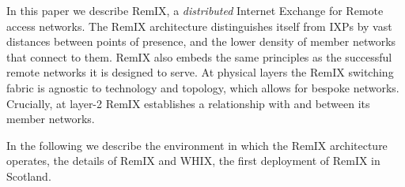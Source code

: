 In this paper we describe RemIX, a \emph{distributed} Internet Exchange for
Remote access networks. The RemIX architecture distinguishes itself from \acp{IXP}
 by vast distances between points of presence, and the lower density
of member networks that connect to them. RemIX also embeds the same
principles as the successful remote networks it is designed to serve.
At physical layers the RemIX switching fabric is agnostic to technology and
topology, which allows for bespoke networks. Crucially, at layer-2 RemIX
establishes a relationship with and between its member networks.

In the following we describe the environment in which the  RemIX architecture operates, the details of RemIX and   WHIX, the first deployment of RemIX  in Scotland.

